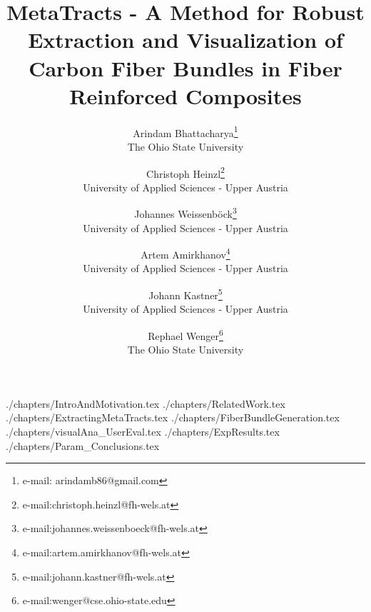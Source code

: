 \documentclass[review,journal]{vgtc}         %
\title{MetaTracts - A Method for Robust Extraction and Visualization of Carbon Fiber Bundles in Fiber Reinforced Composites}
\author{Arindam Bhattacharya\thanks{e-mail: arindamb86@gmail.com}\\ %
	\scriptsize The Ohio State University %
	\and Christoph Heinzl\thanks{e-mail:christoph.heinzl@fh-wels.at}\\ %
	\scriptsize University of Applied Sciences - Upper Austria%
	\and Johannes Weissenb{\"o}ck\thanks{e-mail:johannes.weissenboeck@fh-wels.at}\\ %
	\scriptsize University of Applied Sciences - Upper Austria%
	\and Artem Amirkhanov\thanks{e-mail:artem.amirkhanov@fh-wels.at}\\ %
	\scriptsize University of Applied Sciences - Upper Austria%
	\and Johann Kastner\thanks{e-mail:johann.kastner@fh-wels.at}\\ %
	\scriptsize University of Applied Sciences - Upper Austria%
	\and Rephael Wenger\thanks{e-mail:wenger@cse.ohio-state.edu}\\ %
	\scriptsize The Ohio State University
}
\begin{document}


\maketitle
 {./chapters/IntroAndMotivation.tex}
 {./chapters/RelatedWork.tex}
 {./chapters/ExtractingMetaTracts.tex}
 {./chapters/FiberBundleGeneration.tex}
 {./chapters/visualAna_UserEval.tex}
 {./chapters/ExpResults.tex}
 {./chapters/Param_Conclusions.tex}


\end{document}
